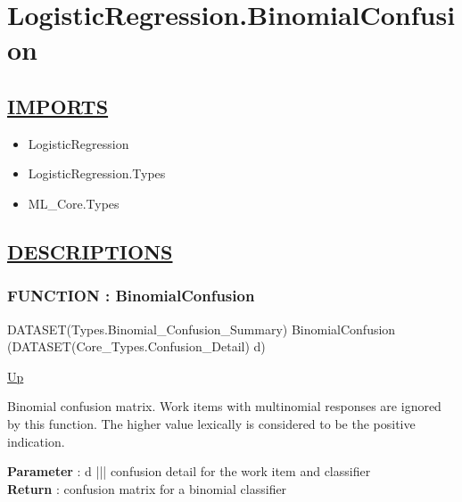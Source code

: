 \chapter*{LogisticRegression.BinomialConfusion}
\hypertarget{ecldoc:toc:LogisticRegression.BinomialConfusion}{}

\section*{\underline{IMPORTS}}
\begin{itemize}
\item LogisticRegression
\item LogisticRegression.Types
\item ML\_Core.Types
\end{itemize}

\section*{\underline{DESCRIPTIONS}}
\subsection*{FUNCTION : BinomialConfusion}
\hypertarget{ecldoc:logisticregression.binomialconfusion}{}
\begin{minipage}[t]{\textwidth}
\begin{flushleft}
DATASET(Types.Binomial\_Confusion\_Summary) BinomialConfusion (DATASET(Core\_Types.Confusion\_Detail) d)
\end{flushleft}
\end{minipage}
\hyperlink{ecldoc:toc:LogisticRegression}{Up}

\par
Binomial confusion matrix. Work items with multinomial responses are ignored by this function. The higher value lexically is considered to be the positive indication.
\par
\textbf{Parameter} : d ||| confusion detail for the work item and classifier \\
\textbf{Return} : confusion matrix for a binomial classifier \\
